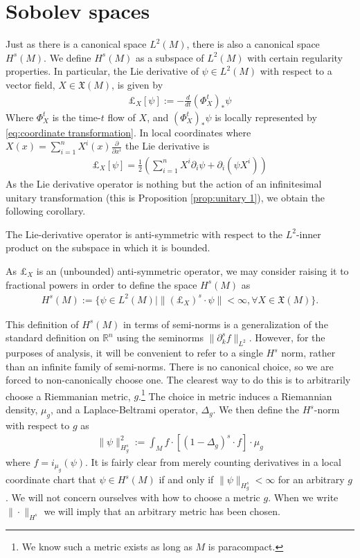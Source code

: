 \documentclass[final,leqno]{siamart}
\begin{document}
\section{Sobolev spaces}
Just as there is a canonical space $L^2(M)$, there is also a canonical space $H^s(M)$.
We define $H^s(M)$ as a subspace of $L^2(M)$ with certain regularity properties.
In particular, the Lie derivative of $\psi \in L^2(M)$ with respect to a vector field, $X \in \mathfrak{X}(M)$, is given by
\begin{align*}
	\pounds_X[ \psi] := - \frac{d}{dt} ( \Phi^{t}_X )_*\psi
\end{align*}
Where $\Phi^t_X$ is the time-$t$ flow of $X$, and $( \Phi^{t}_X )_*\psi$ is locally represented by \eqref{eq:coordinate transformation}.
In local coordinates where $X(x) = \sum_{i=1}^{n} X^i(x) \frac{ \partial}{ \partial x^i}$ the Lie derivative is
\begin{align}
	\pounds_X [\psi] = \frac{1}{2} \left( \sum_{i=1}^{n} X^i \partial_i \psi + \partial_i (\psi X^i) \right) \label{eq:representation}
\end{align}
As the Lie derivative operator is nothing but the action of an infinitesimal unitary transformation (this is Proposition \ref{prop:unitary 1}), we obtain the following corollary.
\begin{corollary}
	The Lie-derivative operator is anti-symmetric with respect to the  $L^2$-inner product on the subspace in which it is bounded.
\end{corollary}
As $\pounds_X$ is an (unbounded) anti-symmetric operator, we may consider raising it to fractional powers in order to define the space $H^s(M)$ as
\begin{align*}
	H^s(M) := \{ \psi \in L^2(M) \mid \| (\pounds_X)^{s} \cdot \psi \| < \infty, \forall X \in \mathfrak{X}(M) \}.
\end{align*}

This definition of $H^s(M)$ in terms of semi-norms is a generalization of the standard definition on $\mathbb{R}^n$ using the seminorms $\| \partial_k^s f \|_{L^2}$.
However, for the purposes of analysis, it will be convenient to refer to a single $H^s$ norm, rather than an infinite family of semi-norms.
There is no canonical choice, so we are forced to non-canonically choose one.
The clearest way to do this is to arbitrarily choose a Riemmanian metric, $g$.\footnote{We know such a metric exists as long as $M$ is paracompact.}
The choice in metric induces a Riemannian density, $\mu_g$, and a Laplace-Beltrami operator, $\Delta_g$.
We then define the $H^s$-norm with respect to $g$ as
\begin{align*}
	\| \psi \|_{H^s_g}^2 := \int_M f \cdot [ (1-\Delta_g)^s \cdot f ] \cdot \mu_g
\end{align*}
where $f = i_{\mu_g}(\psi)$.
It is fairly clear from merely counting derivatives in a local coordinate chart that $\psi \in H^s(M)$ if and only if $\| \psi \|_{H^s_g} < \infty$ for an arbitrary $g$.
We will not concern ourselves with how to choose a metric $g$.
When we write $\| \cdot \|_{H^s}$ we will imply that an arbitrary metric has been chosen.
\end{document}
